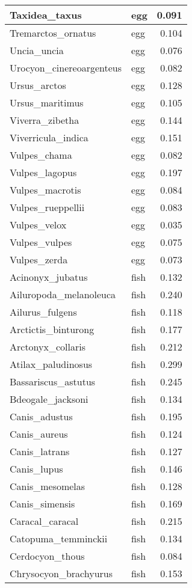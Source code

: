\begin{table}
\begin{tabular}[t]{l|l|r}
\hline
Taxidea\_taxus & egg & 0.091\\
\hline
Tremarctos\_ornatus & egg & 0.104\\
\hline
Uncia\_uncia & egg & 0.076\\
\hline
Urocyon\_cinereoargenteus & egg & 0.082\\
\hline
Ursus\_arctos & egg & 0.128\\
\hline
Ursus\_maritimus & egg & 0.105\\
\hline
Viverra\_zibetha & egg & 0.144\\
\hline
Viverricula\_indica & egg & 0.151\\
\hline
Vulpes\_chama & egg & 0.082\\
\hline
Vulpes\_lagopus & egg & 0.197\\
\hline
Vulpes\_macrotis & egg & 0.084\\
\hline
Vulpes\_rueppellii & egg & 0.083\\
\hline
Vulpes\_velox & egg & 0.035\\
\hline
Vulpes\_vulpes & egg & 0.075\\
\hline
Vulpes\_zerda & egg & 0.073\\
\hline
Acinonyx\_jubatus & fish & 0.132\\
\hline
Ailuropoda\_melanoleuca & fish & 0.240\\
\hline
Ailurus\_fulgens & fish & 0.118\\
\hline
Arctictis\_binturong & fish & 0.177\\
\hline
Arctonyx\_collaris & fish & 0.212\\
\hline
Atilax\_paludinosus & fish & 0.299\\
\hline
Bassariscus\_astutus & fish & 0.245\\
\hline
Bdeogale\_jacksoni & fish & 0.134\\
\hline
Canis\_adustus & fish & 0.195\\
\hline
Canis\_aureus & fish & 0.124\\
\hline
Canis\_latrans & fish & 0.127\\
\hline
Canis\_lupus & fish & 0.146\\
\hline
Canis\_mesomelas & fish & 0.128\\
\hline
Canis\_simensis & fish & 0.169\\
\hline
Caracal\_caracal & fish & 0.215\\
\hline
Catopuma\_temminckii & fish & 0.134\\
\hline
Cerdocyon\_thous & fish & 0.084\\
\hline
Chrysocyon\_brachyurus & fish & 0.153\\

\end{tabular}
\end{table}

